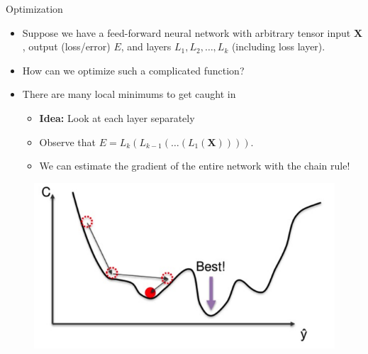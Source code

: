 \documentclass{beamer}
\begin{document}
\begin{frame}{Optimization}

    \begin{itemize}
        \item<1-> Suppose we have a feed-forward neural network with arbitrary tensor input $\bm{X}$, output (loss/error) $E$, and layers $L_1, L_2, \hdots, L_k$ (including loss layer).
        \item<1-> How can we optimize such a complicated function?
        \item<1-> There are many local minimums to get caught in
        \begin{itemize}
            \item<2-> {\bf Idea:} Look at each layer separately
            \item<2-> Observe that $E = L_k(L_{k-1} (\hdots (L_1(\bm{X}))))$.
            \item<2-> We can estimate the gradient of the entire network with the chain rule!
        \end{itemize}
    \end{itemize}

    \begin{figure}
        \includegraphics[width=.7\textwidth]{minimum}
    \end{figure}
\end{frame}
\end{document}
